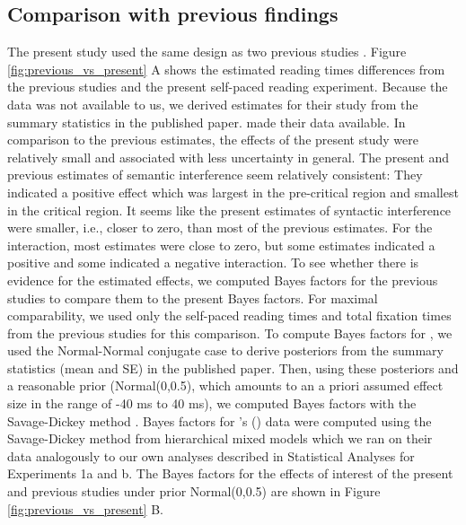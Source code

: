 \documentclass[review,preprint,12pt,authoryear,floatsintext]{elsarticle}
\begin{document}
{\subsection{Comparison with previous findings}\label{comparison}
{The present study used the same design as two previous studies \citep{vandyke07, mertzen}. Figure \ref{fig:previous_vs_present} A shows the estimated reading times differences from the previous studies and the present self-paced reading experiment. Because the \cite{vandyke07} data was not available to us, we derived estimates for their study from the summary statistics in the published paper. \cite{mertzen} made their data available. In comparison to the previous estimates, the effects of the present study were relatively small and associated with less uncertainty in general. The present and previous estimates of semantic interference seem relatively consistent: They indicated a positive effect which was largest in the pre-critical region and smallest in the critical region. It seems like the present estimates of syntactic interference were smaller, i.e., closer to zero, than most of the previous estimates. For the interaction, most estimates were close to zero, but some estimates indicated a positive and some indicated a negative interaction. To see whether there is evidence for the estimated effects, we computed Bayes factors for the previous studies to compare them to the present Bayes factors. For maximal comparability, we used only the self-paced reading times and total fixation times from the previous studies for this comparison. To compute Bayes factors for \cite{vandyke07}, we used the Normal-Normal conjugate case \citep{lee2012bayesian} to derive posteriors from the summary statistics (mean and SE) in the published paper. Then, using these posteriors and a reasonable prior (Normal(0,0.5), which amounts to an a priori assumed effect size in the range of -40 ms to 40 ms), we computed Bayes factors with the Savage-Dickey method \citep{wagenmakers_savagedickey, vuorre2017_savagedickey, dickey1970, dickey1971weighted, verdinelli1995computing}. Bayes factors for \citeauthor{mertzen}'s (\citeyear{mertzen}) data were computed using the Savage-Dickey method from hierarchical mixed models which we ran on their data analogously to our own analyses described in Statistical Analyses for Experiments 1a and b. The Bayes factors for the effects of interest of the present and previous studies under prior Normal(0,0.5) are shown in Figure \ref{fig:previous_vs_present} B.

}}
\end{document}
